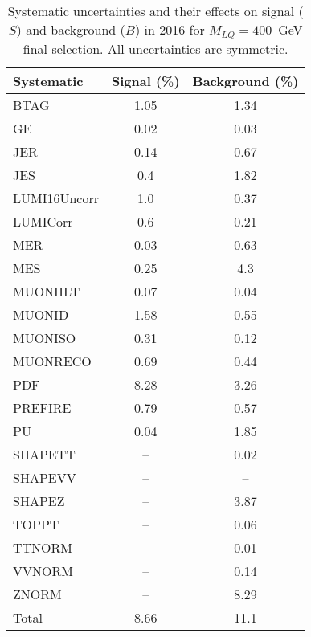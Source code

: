 \begin{table}[htbp]
\begin{center}
\caption{Systematic uncertainties and their effects on signal ($S$) and background ($B$) in 2016 for $M_{LQ}=400$~GeV final selection. All uncertainties are symmetric.}
\begin{tabular}{lcc}
\hline\hline
Systematic & Signal (\%) & Background (\%) \\ \hline 
BTAG & 1.05 & 1.34\\ 
GE & 0.02 & 0.03\\ 
JER & 0.14 & 0.67\\ 
JES & 0.4 & 1.82\\ 
LUMI16Uncorr & 1.0 & 0.37\\ 
LUMICorr & 0.6 & 0.21\\ 
MER & 0.03 & 0.63\\ 
MES & 0.25 & 4.3\\ 
MUONHLT & 0.07 & 0.04\\ 
MUONID & 1.58 & 0.55\\ 
MUONISO & 0.31 & 0.12\\ 
MUONRECO & 0.69 & 0.44\\ 
PDF & 8.28 & 3.26\\ 
PREFIRE & 0.79 & 0.57\\ 
PU & 0.04 & 1.85\\ 
SHAPETT & -- & 0.02\\ 
SHAPEVV & -- & --\\ 
SHAPEZ & -- & 3.87\\ 
TOPPT & -- & 0.06\\ 
TTNORM & -- & 0.01\\ 
VVNORM & -- & 0.14\\ 
ZNORM & -- & 8.29\\ 
Total & 8.66 & 11.1\\ \hline \hline
\end{tabular}
\label{tab:SysUncertainties_uujj_400}
\end{center}
\end{table}

